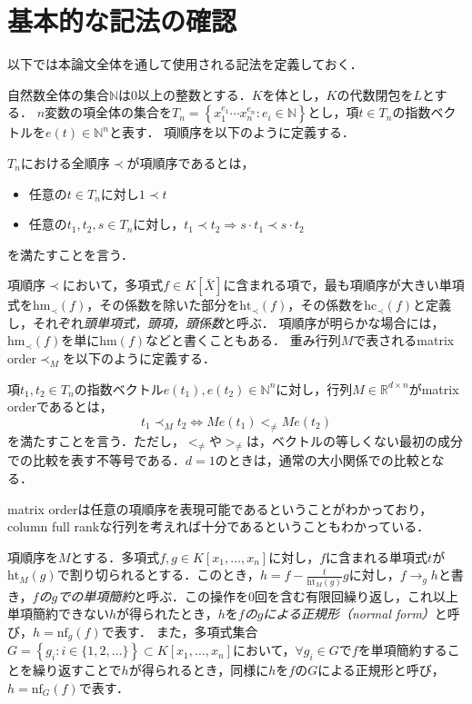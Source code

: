 \section{基本的な記法の確認}
以下では本論文全体を通して使用される記法を定義しておく．
\par
自然数全体の集合$\mathbb{N}$は$0$以上の整数とする．$K$を体とし，$K$の代数閉包を$L$とする．
$n$変数の項全体の集合を$T_n = \left\{ x_1^{e_1} \cdots x_n^{e_n} : e_i \in \mathbb{N} \right\}$とし，項$t \in T_n$の指数ベクトルを$e(t) \in \mathbb{N}^{n}$と表す．
項順序を以下のように定義する．
\begin{definition}[項順序]
	$T_n$における全順序$\prec$が項順序であるとは，
	\begin{itemize}
		\item 任意の$t \in T_n$に対し$1 \prec t$
		\item 任意の$t_1, t_2, s \in T_n$に対し，$t_1 \prec t_2 \Longrightarrow s\cdot t_1 \prec s\cdot t_2$
	\end{itemize}
	を満たすことを言う．
\end{definition}
項順序$\prec$において，多項式$f\in K[\bar{X}]$に含まれる項で，最も項順序が大きい単項式を$\mathrm{hm}_{\prec}(f)$，その係数を除いた部分を$\mathrm{ht}_{\prec}(f)$，その係数を$\mathrm{hc}_{\prec}(f)$と定義し，それぞれ\emph{頭単項式，頭項，頭係数}と呼ぶ．
項順序が明らかな場合には，$\mathrm{hm}_{\prec}(f)$を単に$\mathrm{hm}(f)$などと書くこともある．
重み行列$M$で表されるmatrix order$\prec_M$を以下のように定義する．
\begin{definition}
	項$t_1, t_2 \in T_n$の指数ベクトル$e(t_1), e(t_2) \in \mathbb{N}^{n}$に対し，行列$M \in \mathbb{R}^{d\times n}$がmatrix orderであるとは，
	$$t_1 \prec_M t_2 \Longleftrightarrow Me(t_1) <_{\ne} Me(t_2)$$
	を満たすことを言う．ただし，$<_{\ne}$や$>_{\ne}$は，ベクトルの等しくない最初の成分での比較を表す不等号である．$d=1$のときは，通常の大小関係での比較となる．
\end{definition}
matrix orderは任意の項順序を表現可能\cite{MR826583}であるということがわかっており，column full rankな行列を考えれば十分であるということもわかっている．
\par
項順序を$M$とする．多項式$f, g \in K[x_1,\dots, x_n]$に対し，$f$に含まれる単項式$t$が$\mathrm{ht}_M(g)$で割り切られるとする．このとき，$h = f - \frac{t}{\mathrm{ht}_M(g)}g$に対し，$f \to_g h$と書き，\emph{$f$の$g$での単項簡約}と呼ぶ．この操作を$0$回を含む有限回繰り返し，これ以上単項簡約できない$h$が得られたとき，$h$を\emph{$f$の$g$による正規形（normal form）}と呼び，$h = \mathrm{nf}_g(f)$で表す．
また，多項式集合$G=\left\{g_i :i \in \{1,2, \dots\}\right\} \subset K[x_1, \dots, x_n]$において，$\forall g_i \in G$で$f$を単項簡約することを繰り返すことで$h$が得られるとき，同様に$h$を$f$の$G$による正規形と呼び，$h = \mathrm{nf}_G(f)$で表す．









